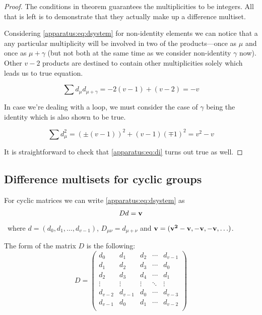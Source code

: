     \begin{proof}
        The conditions in theorem guarantees the multiplicities to be integers. All that is left is to demonstrate that they actually make up a difference multiset.
        
        Considering \eqref{apparatus:eq:dsystem} for non-identity elements we can notice that a any particular multiplicity will be involved in two of the products---once as $\mu$ and once as $\mu+\gamma$ (but not both at the same time as we consider non-identity $\gamma$ now). Other $v-2$ products are destined to contain other multiplicities solely which leads us to true equation.
        
        \begin{equation}
            \sum d_\mu d_{\mu+\gamma} = -2(v-1) + (v-2) = -v
        \end{equation}

        In case we're dealing with a loop, we must consider the case of $\gamma$ being the identity which is also shown to be true.
        
        \begin{equation}
            \sum d_\mu^2  = \left( \pm (v-1) \right)^2 + (v-1) \left( \mp 1 \right)^2 = v^2 - v
        \end{equation}
    
        It is straightforward to check that \eqref{apparatus:eq:di} turns out true as well.
    \end{proof}

\subsection{Difference multisets for cyclic groups}
    For cyclic matrices we can write \eqref{apparatus:eq:dsystem} as
    \begin{equation}
        D d = \bf v
    \end{equation}\
    where $d = (d_0, d_1, \ldots, d_{v-1})$, $D_{\mu\nu} = d_{\mu+\nu}$ and $\bf v = (v^2-v, -v, -v, \ldots)$.
    
    The form of the matrix $D$ is the following:
    \begin{equation}
        \label{general:eq:anticirculant_matrix}
        D =
        \begin{pmatrix}
            d_0 & d_1 & d_2 & \cdots & d_{v-1} \\ 
            d_1 & d_2 & d_3 & \cdots & d_0 \\
            d_2 & d_3 & d_4 & \cdots & d_1 \\
            \vdots & \vdots & \vdots & \ddots & \vdots \\
            d_{v-2} & d_{v-1} & d_0 & \cdots & d_{v-3} \\
            d_{v-1} & d_0 & d_1 & \cdots & d_{v-2} \\
        \end{pmatrix}
    \end{equation}
    
